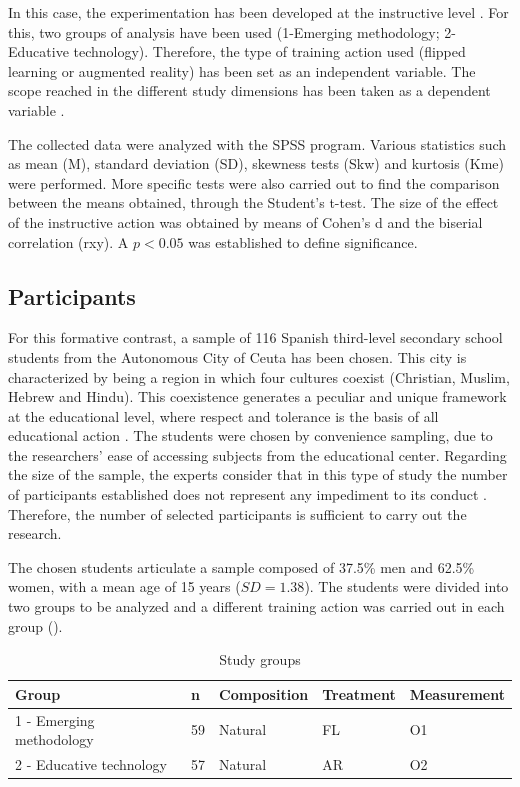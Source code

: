 \documentclass{textolivre}
\begin{document}
In this case, the experimentation has been developed at the instructive level \cite{morenoguerrero+romerorodriguez+lopezbelmonte+alonsogarcia2020}. %
For this, two groups of analysis have been used (1-Emerging methodology; 2-Educative technology). Therefore, the type of training action used (flipped learning or augmented reality) has been set as an independent variable. The scope reached in the different study dimensions has been taken as a dependent variable \cite{hinojolucena2019}. %

The collected data were analyzed with the SPSS program. Various statistics such as mean (M), standard deviation (SD), skewness tests (Skw) and kurtosis (Kme) were performed. More specific tests were also carried out to find the comparison between the means obtained, through the Student's t-test. The size of the effect of the instructive action was obtained by means of Cohen's d and the biserial correlation (rxy). A $p<0.05$ was established to define significance.

\subsection{Participants}
For this formative contrast, a sample of 116 Spanish third-level secondary school students from the Autonomous City of Ceuta has been chosen. This city is characterized by being a region in which four cultures coexist (Christian, Muslim, Hebrew and Hindu). This coexistence generates a peculiar and unique framework at the educational level, where respect and tolerance is the basis of all educational action \cite{lopezbelmonte+morenoguerrero+lopeznunes+pozosanchez2019}. %
The students were chosen by convenience sampling, due to the researchers' ease of accessing subjects from the educational center. Regarding the size of the sample, the experts consider that in this type of study the number of participants established does not represent any impediment to its conduct \cite{chou2019, yilmaz2018}. Therefore, the number of selected participants is sufficient to carry out the research.

The chosen students articulate a sample composed of 37.5\% men and 62.5\% women, with a mean age of 15 years ($SD = 1.38$). The students were divided into two groups to be analyzed and a different training action was carried out in each group ().

\begin{table}[htpb]
\caption{Study groups}
\label{tab1}
\centering
\begin{tabular}{lllll}
\toprule 
Group & n & Composition & Treatment & Measurement
\\ 
\midrule
1 - Emerging methodology & 59 & Natural & FL & O1
\\ 
2 - Educative technology & 57 & Natural & AR & O2
 \\ 
\bottomrule
\end{tabular}
\centering
{}
\end{table}
\end{document}
